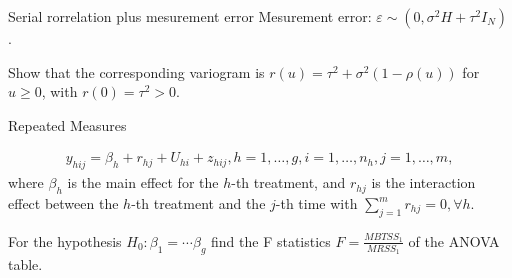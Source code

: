 \documentclass[UTF8,a4paper,10pt]{article}
\begin{document}
          
  \begin{Problem}[]{Serial rorrelation plus mesurement error}
    Mesurement error: \(\varepsilon \sim (0,\sigma^2 H+\tau^2I_N)\).

    Show that the corresponding variogram is \(r(u) = \tau^2+\sigma^2(1-\rho(u))\) for \(u\geq 0\), with \(r(0) = \tau^2>0\).

    
      \end{Problem} 


  \begin{Problem}[]{Repeated Measures}

    \begin{equation*}
      \begin{aligned}
        y_{hij} = \beta_{h}+r_{hj}+ U_{hi}+z_{hij}, h = 1,\ldots,g, i=1,\ldots,n_h, j=1,\ldots,m,
      \end{aligned}
    \end{equation*}
    where \(\beta_h\) is the main effect for the \(h\)-th treatment, and \(r_{hj}\) is the interaction effect between the \(h\)-th treatment and the \(j\)-th time with \(\sum_{j=1}^{m}r_{hj} = 0 ,\forall h\).

    For the hypothesis \(H_0:\beta_1 = \cdots\beta_g\)
find the F statistics \(F = \frac{MBTSS_1}{MRSS_1}\) of the ANOVA table.

    
  \end{Problem} 

  
  \begin{solution}\,\\


  \end{solution}
    
\end{document}
